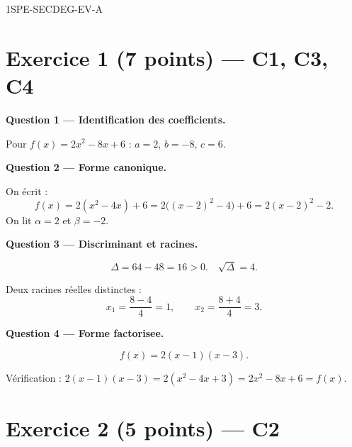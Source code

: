 \begin{corrige}{1SPE-SECDEG-EV-A}

\section*{Exercice 1 \hfill (7 points) — C1, C3, C4}


\bigskip
\textbf{Question 1 — Identification des coefficients.}


Pour $f(x) = 2x^2 - 8x + 6$ : $a = 2$, $b = -8$, $c = 6$.

\medskip
\textbf{Question 2 — Forme canonique.}


On écrit :
\[
f(x)=2(x^2-4x)+6
=2\bigl((x-2)^2-4\bigr)+6=2(x-2)^2-2.
\]
On lit $\alpha=2$ et $\beta=-2$.

\medskip
\textbf{Question 3 — Discriminant et racines.}


\[
\Delta = 64 - 48 = 16 > 0. \quad \sqrt{\Delta} = 4.
\]

Deux racines réelles distinctes :
\[
x_1 = \frac{8 - 4}{4} = 1, \qquad x_2 = \frac{8 + 4}{4} = 3.
\]

\medskip
\textbf{Question 4 — Forme factorisee.}


\[
\boxed{f(x) = 2(x-1)(x-3).}
\]

Vérification : $2(x-1)(x-3) = 2(x^2 - 4x + 3) = 2x^2 - 8x + 6 = f(x)$. \checkmark

\section*{Exercice 2 \hfill (5 points) — C2}



\end{corrige}
